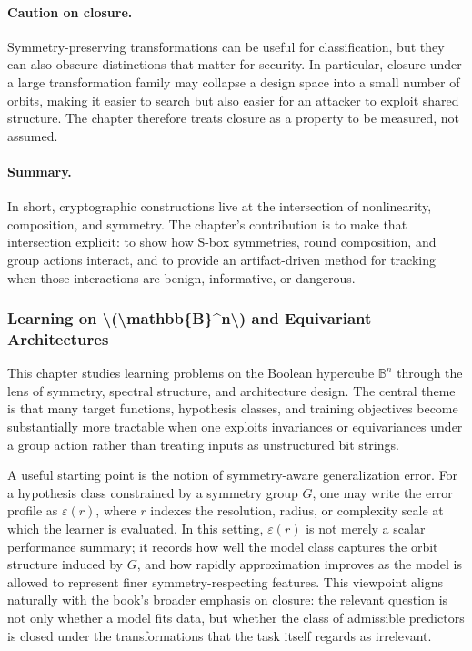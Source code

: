 \documentclass[11pt]{article}
\begin{document}
\paragraph{Caution on closure.} Symmetry-preserving transformations can be useful for classification, but they can also obscure distinctions that matter for security. In particular, closure under a large transformation family may collapse a design space into a small number of orbits, making it easier to search but also easier for an attacker to exploit shared structure. The chapter therefore treats closure as a property to be measured, not assumed.

\paragraph{Summary.} In short, cryptographic constructions live at the intersection of nonlinearity, composition, and symmetry. The chapter's contribution is to make that intersection explicit: to show how S-box symmetries, round composition, and group actions interact, and to provide an artifact-driven method for tracking when those interactions are benign, informative, or dangerous.


\subsubsection{Learning on \textbackslash{}(\textbackslash{}mathbb\{B\}\textasciicircum{}n\textbackslash{}) and Equivariant Architectures}

This chapter studies learning problems on the Boolean hypercube \(\mathbb{B}^n\) through the lens of symmetry, spectral structure, and architecture design. The central theme is that many target functions, hypothesis classes, and training objectives become substantially more tractable when one exploits invariances or equivariances under a group action rather than treating inputs as unstructured bit strings.

A useful starting point is the notion of symmetry-aware generalization error. For a hypothesis class constrained by a symmetry group \(G\), one may write the error profile as \(\varepsilon(r)\), where \(r\) indexes the resolution, radius, or complexity scale at which the learner is evaluated. In this setting, \(\varepsilon(r)\) is not merely a scalar performance summary; it records how well the model class captures the orbit structure induced by \(G\), and how rapidly approximation improves as the model is allowed to represent finer symmetry-respecting features. This viewpoint aligns naturally with the book's broader emphasis on closure: the relevant question is not only whether a model fits data, but whether the class of admissible predictors is closed under the transformations that the task itself regards as irrelevant.
\end{document}
